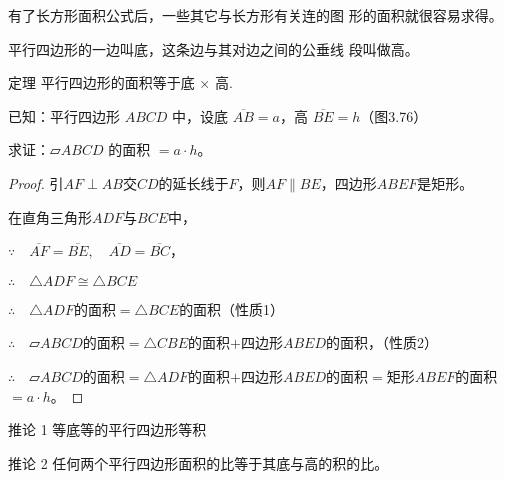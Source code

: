有了长方形面积公式后，一些其它与长方形有关连的图
形的面积就很容易求得。

平行四边形的一边叫底，这条边与其对边之间的公垂线
段叫做高。

\begin{Theorem}{定理}
平行四边形的面积等于底 $\times$ 高.
\end{Theorem}

已知：平行四边形 $ABCD$ 中，设底 $\overline{AB}=a$，高 $\overline{BE}=h$（图3.76）

求证：$\parallelogram ABCD$ 的面积 $=a\cdot h$。

\begin{figure}
    \centering
    \begin{tikzpicture}
    \end{tikzpicture}
    \caption{}
\end{figure}

\begin{proof}
引$AF\perp AB$交$CD$的延长线于$F$，则$AF\parallel BE$，四边形$ABEF$是矩形。

在直角三角形$ADF$与$BCE$中，

$\because\quad \overline{AF}=\overline{BE},\quad \overline{AD}=\overline{BC}$，

$\therefore\quad     \triangle ADF\cong \triangle BCE$

$\therefore\quad \triangle ADF$的面积$=\triangle BCE$的面积（性质1）

$\therefore\quad \parallelogram ABCD$的面积$=\triangle CBE$的面积$+$四边形$ABED$的面积，（性质2）

$\therefore\quad \parallelogram ABCD$的面积$=\triangle ADF$的面积$+$四边形$ABED$的面积$=$矩形$ABEF$的面积$=a\cdot h$。
\end{proof}


\begin{Deduction}{推论 1} 等底等的平行四边形等积
\end{Deduction}

\begin{Deduction}{推论 2}
任何两个平行四边形面积的比等于其底与高的积的比。
\end{Deduction}

